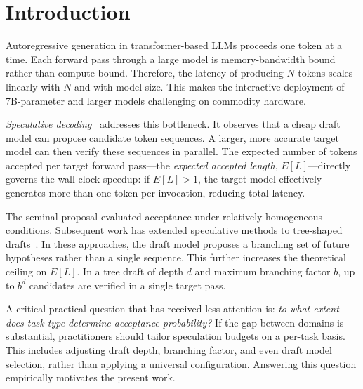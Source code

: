 \documentclass[conference]{IEEEtran}
\begin{document}
\section{Introduction}

Autoregressive generation in transformer-based LLMs proceeds one token at a
time. Each forward pass through a large model is memory-bandwidth bound rather than compute bound. Therefore, the latency of producing $N$ tokens scales linearly with $N$ and with model size. This makes the interactive deployment of 7B-parameter and larger models challenging on commodity hardware.

\emph{Speculative decoding}~\cite{leviathan2023} addresses this bottleneck. It observes that a cheap draft model can propose candidate token sequences. A larger, more accurate target model can then verify these sequences in parallel. The expected
number of tokens accepted per target forward pass---the
\emph{expected accepted length}, $E[L]$---directly governs the wall-clock
speedup: if $E[L] > 1$, the target model effectively generates more than one
token per invocation, reducing total latency.

The seminal proposal evaluated acceptance under relatively homogeneous conditions. Subsequent work has extended speculative methods to tree-shaped drafts~\cite{miao2024specinfer,cai2024medusa}. In these approaches, the draft model proposes a branching set of future hypotheses rather than a single sequence. This further increases the theoretical ceiling on $E[L]$. In a tree draft of depth $d$
and maximum branching factor $b$, up to $b^d$ candidates are verified in a
single target pass.

A critical practical question that has received less attention is: \emph{to
what extent does task type determine acceptance probability?} If the gap between domains is substantial, practitioners should tailor speculation budgets on a per-task basis. This includes adjusting draft depth, branching factor, and even draft model selection, rather than applying a universal configuration. Answering
this question empirically motivates the present work.
\end{document}
